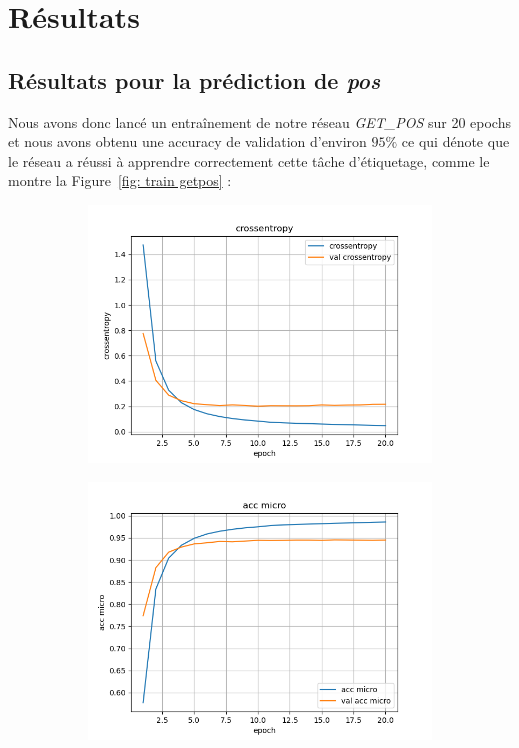 \documentclass[a4paper]{article}
\begin{document}
\section{Résultats}

\subsection{Résultats pour la prédiction de \textit{pos}}
Nous avons donc lancé un entraînement de notre réseau \textit{GET\_POS} sur 20 epochs et 
nous avons obtenu une accuracy de validation d'environ $95\%$ ce qui dénote que le réseau a réussi à apprendre 
correctement cette tâche d'étiquetage, comme le montre la Figure~\ref{fig: train getpos} :

\begin{figure}[H]
    \centering
    \begin{subfigure}{0.32\textwidth}
        \centering
        \includegraphics[width=\linewidth]{../logs/get_pos/crossentropy.png}
    \end{subfigure}
    \begin{subfigure}{0.32\textwidth}
        \centering
        \includegraphics[width=\linewidth]{../logs/get_pos/acc micro.png}

\end{subfigure}
\end{figure}
\end{document}
